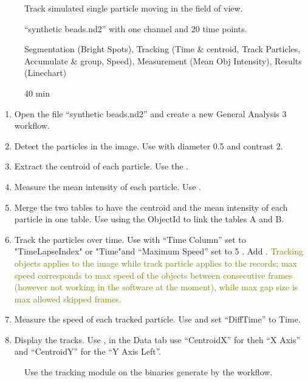 \pagebreak
{}

\begin{description}
    \item[] Track simulated single particle moving in the field of view.
    \item[] ``synthetic beads.nd2'' with one channel and 20 time points.
    \item[] Segmentation (Bright Spots), Tracking (Time \& centroid, Track Particles, Accumulate \& group, Speed), Measurement (Mean Obj Intensity), Results (Linechart)
    \item[] 40 min
    \item[]
\end{description}

\begin{enumerate}
    \item Open the file “synthetic beads.nd2” and create a new General Analysis 3 workflow.
    \item Detect the particles in the image. \soln Use  with diameter 0.5 and contrast 2. \solnend
    \item Extract the centroid of each particle. \soln Use the . \solnend
    \item Measure the mean intensity of each particle. \soln Use . \solnend
    \item Merge the two tables to have the centroid and the mean intensity of each particle in one table.  \soln Use  using the ObjectId to link the tables A and B. \solnend
    \item Track the particles over time. Use  with “Time Column” set to "TimeLapseIndex" or "Time"\soln and “Maximum Speed” set to 5 \solnend. Add . \textcolor{olive}{Tracking objects applies to the image while track particle applies to the records; max speed corresponds to max speed of the objects between consecutive frames (however not working in the software at the moment), while max gap size is max allowed skipped frames.}
    \item Measure the speed of each tracked particle. \soln Use  and set “DiffTime” to Time. \solnend
    \item Display the tracks. Use , in the Data tab use “CentroidX” for theh “X Axis” and “CentroidY” for the “Y Axis Left”.
\end{enumerate}

\begin{description}
    \item[] Use the tracking module on the binaries generate by the workflow.
\end{description}
